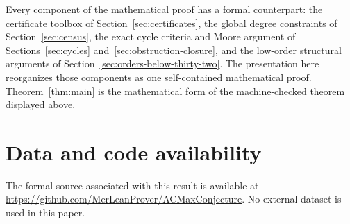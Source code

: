 \documentclass[11pt]{article}
\numberwithin{equation}{section}
\theoremstyle{definition}
\theoremstyle{remark}
\begin{document}
Every component of the mathematical proof has a formal counterpart: the
certificate toolbox of Section~\ref{sec:certificates}, the global degree
constraints of Section~\ref{sec:census}, the exact cycle criteria and Moore
argument of Sections~\ref{sec:cycles} and~\ref{sec:obstruction-closure}, and
the low-order structural arguments of
Section~\ref{sec:orders-below-thirty-two}.  The presentation here reorganizes
those components as one self-contained mathematical proof.
Theorem~\ref{thm:main} is the mathematical form of the machine-checked
theorem displayed above.

\section*{Data and code availability}

The formal source associated with this result is available at
\url{https://github.com/MerLeanProver/ACMaxConjecture}.
No external dataset is used in this paper.

\printbibliography
\end{document}
